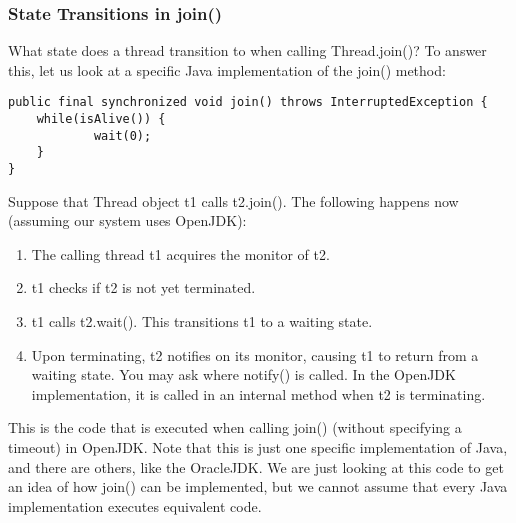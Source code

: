 \documentclass[main.tex]{subfiles}
\begin{document}
\subsubsection{State Transitions in join()}
What state does a thread transition to when calling Thread.join()? To answer this, let us look at a specific Java implementation of the join() method:
\begin{verbatim}
public final synchronized void join() throws InterruptedException {
    while(isAlive()) {
            wait(0);
    }
}
\end{verbatim}
Suppose that Thread object t1 calls t2.join(). The following happens now (assuming our system uses OpenJDK):
\begin{enumerate}
  \item The calling thread t1 acquires the monitor of t2.
  \item t1 checks if t2 is not yet terminated.
  \item t1 calls t2.wait(). This transitions t1 to a waiting state.
  \item Upon terminating, t2 notifies on its monitor, causing t1 to return from a waiting state. You may ask where notify() is called. In the OpenJDK implementation, it is called in an internal method when t2 is terminating.
\end{enumerate}
This is the code that is executed when calling join() (without specifying a timeout) in OpenJDK. Note that this is just one specific implementation of Java, and there are others, like the OracleJDK. We are just looking at this code to get an idea of how join() can be implemented, but we cannot assume that every Java implementation executes equivalent code.


\end{document}
